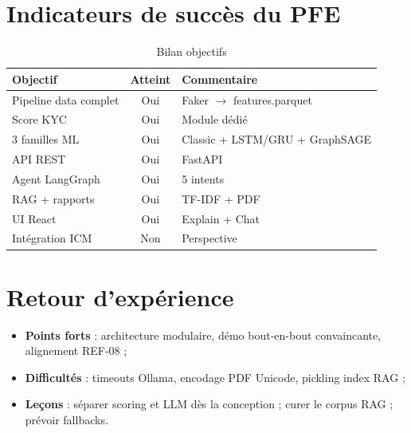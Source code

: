 \section{Indicateurs de succès du PFE}

\begin{table}[H]
  \centering
  \caption{Bilan objectifs}
  \begin{tabular}{|l|c|p{7cm}|}
    \hline
    \textbf{Objectif} & \textbf{Atteint} & \textbf{Commentaire} \\
    \hline
    Pipeline data complet & Oui & Faker $\rightarrow$ features.parquet \\
    \hline
    Score KYC & Oui & Module dédié \\
    \hline
    3 familles ML & Oui & Classic + LSTM/GRU + GraphSAGE \\
    \hline
    API REST & Oui & FastAPI \\
    \hline
    Agent LangGraph & Oui & 5 intents \\
    \hline
    RAG + rapports & Oui & TF-IDF + PDF \\
    \hline
    UI React & Oui & Explain + Chat \\
    \hline
    Intégration ICM & Non & Perspective \\
    \hline
  \end{tabular}
\end{table}

\section{Retour d'expérience}

\begin{itemize}[leftmargin=*]
  \item \textbf{Points forts} : architecture modulaire, démo bout-en-bout convaincante, alignement REF-08 ;
  \item \textbf{Difficultés} : timeouts Ollama, encodage PDF Unicode, pickling index RAG ;
  \item \textbf{Leçons} : séparer scoring et LLM dès la conception ; curer le corpus RAG ; prévoir fallbacks.
\end{itemize}
